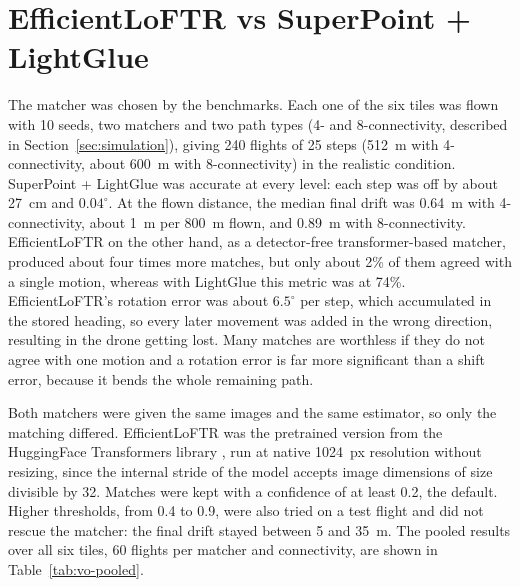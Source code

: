 \documentclass[english, Lau, oneside]{sapthesis}%
\begin{document}
\section{EfficientLoFTR vs SuperPoint + LightGlue}
\label{sec:vo-matchers}
The matcher was chosen by the benchmarks. Each one of the six tiles was flown with 10 seeds, two matchers and two path types (4- and 8-connectivity, described in Section~\ref{sec:simulation}), giving 240 flights of 25 steps (512~m with 4-connectivity, about 600~m with 8-connectivity) in the realistic condition. SuperPoint + LightGlue was accurate at every level: each step was off by about 27~cm and $0.04^\circ$. At the flown distance, the median final drift was 0.64~m with 4-connectivity, about 1~m per 800~m flown, and 0.89~m with 8-connectivity. EfficientLoFTR on the other hand, as a detector-free transformer-based matcher, produced about four times more matches, but only about 2\% of them agreed with a single motion, whereas with LightGlue this metric was at 74\%. EfficientLoFTR's rotation error was about $6.5^\circ$ per step, which accumulated in the stored heading, so every later movement was added in the wrong direction, resulting in the drone getting lost. Many matches are worthless if they do not agree with one motion and a rotation error is far more significant than a shift error, because it bends the whole remaining path.

Both matchers were given the same images and the same estimator, so only the matching differed. EfficientLoFTR was the pretrained version from the HuggingFace Transformers library \citep{wolf2020transformers}, run at native 1024~px resolution without resizing, since the internal stride of the model accepts image dimensions of size divisible by 32. Matches were kept with a confidence of at least 0.2, the default. Higher thresholds, from 0.4 to 0.9, were also tried on a test flight and did not rescue the matcher: the final drift stayed between 5 and 35~m. The pooled results over all six tiles, 60 flights per matcher and connectivity, are shown in Table~\ref{tab:vo-pooled}.
\end{document}
